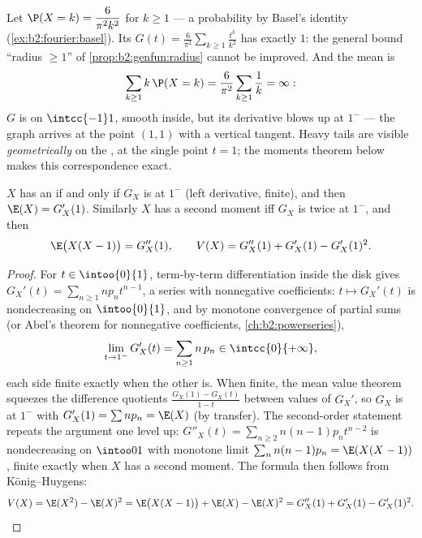 \begin{example}\label{ex:b2:genfun:heavytail}
Let $\P(X = k) = \dfrac{6}{\pi^2k^2}$ for $k \geq 1$ --- a
probability  by Basel's identity
(\cref{ex:b2:fourier:basel}). Its 
$G(t) = \frac6{\pi^2}\sum_{k\geq1}\frac{t^k}{k^2}$ has  exactly $1$: the general bound ``radius $\geq
1$'' of \cref{prop:b2:genfun:radius} cannot be improved. And
the mean is
\[
\sum_{k\geq1}k\,\P(X = k) =
\frac6{\pi^2}\sum_{k\geq1}\frac1k = \infty :
\]
$G$ is  on $\intcc{-1}1$, smooth inside, but its
derivative blows up at $1^-$ --- the graph arrives at the
point $(1, 1)$ with a vertical tangent. Heavy tails are
visible \emph{geometrically} on the , at
the single point $t = 1$; the moments theorem below makes
this correspondence exact.
\end{example}

\begin{theorem}\label{thm:b2:genfun:moments}
$X$ has an  if and only if $G_X$ is  at
$1^-$ (left derivative, finite), and then $\E(X) = G_X'(1)$.
Similarly $X$ has a second moment iff $G_X$ is twice
 at $1^-$, and then
\[
\E\bigl(X(X - 1)\bigr) = G_X''(1),
\qquad
V(X) = G_X''(1) + G_X'(1) - G_X'(1)^2 .
\]
\end{theorem}

\begin{proof}
For $t \in \intoo{0}{1}$, term-by-term differentiation inside the
disk gives $G_X'(t) = \sum_{n\geq1} np_n t^{n-1}$, a series with
nonnegative coefficients: $t \mapsto G_X'(t)$ is nondecreasing on
$\intoo{0}{1}$, and by monotone convergence of partial sums (or
Abel's theorem for nonnegative coefficients,
\cref{ch:b2:powerseries}),
\[
\lim_{t \to 1^-} G_X'(t)
= \sum_{n\geq1} n\,p_n \in \intcc{0}{+\infty} ,
\]
each side finite exactly when the other is. When finite, the mean
value theorem squeezes the difference quotients $\frac{G_X(1) -
G_X(t)}{1 - t}$ between values of $G_X'$, so $G_X$ is
 at $1^-$ with $G_X'(1) = \sum np_n = \E(X)$ (by
transfer). The second-order statement repeats the argument one level
up: $G''_X(t) = \sum_{n\geq2}n(n-1)p_nt^{n-2}$ is
nondecreasing on $\intoo01$ with monotone limit
$\sum_nn(n-1)p_n = \E(X(X-1))$, finite exactly when $X$ has
a second moment. The  formula then follows from
K\"onig--Huygens:
\[
V(X) = \E(X^2) - \E(X)^2 = \E\bigl(X(X-1)\bigr) + \E(X) -
\E(X)^2 = G''_X(1) + G'_X(1) - G'_X(1)^2 .
\]
\end{proof}

